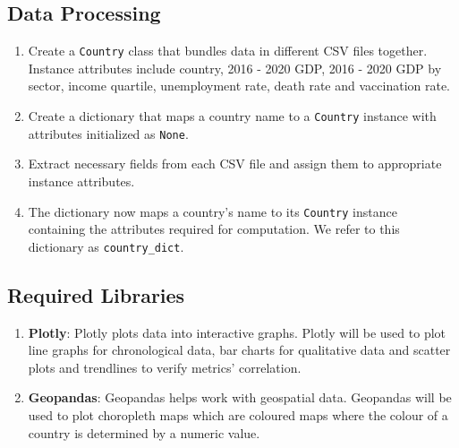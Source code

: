 \documentclass[fontsize=11pt]{article}
\begin{document}
    \subsection*{Data Processing}
    \begin{enumerate}
        \item Create a \texttt{Country} class that bundles data in different CSV files together. Instance attributes include country, 2016 - 2020 GDP, 2016 - 2020 GDP by sector, income quartile, unemployment rate, death rate and vaccination rate.
        \item Create a dictionary that maps a country name to a \texttt{Country} instance with attributes initialized as \texttt{None}.
        \item Extract necessary fields from each CSV file and assign them to appropriate instance attributes.
        \item The dictionary now maps a country's name to its \texttt{Country} instance containing the attributes required for computation. We refer to this dictionary as \texttt{country\_dict}.
    \end{enumerate}

    \subsection*{Required Libraries}
    \begin{enumerate}
        \item \textbf{Plotly}: Plotly plots data into interactive graphs. Plotly will be used to plot line graphs for chronological data, bar charts for qualitative data and scatter plots and trendlines to verify metrics' correlation.
        \item \textbf{Geopandas}: Geopandas helps work with geospatial data. Geopandas will be used to plot choropleth maps which are coloured maps where the colour of a country is determined by a numeric value.
    \end{enumerate}
\end{document}
